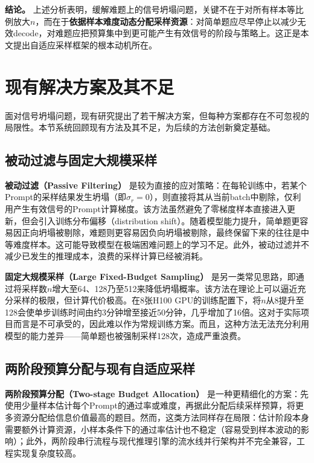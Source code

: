 \textbf{结论。} 上述分析表明，缓解难题上的信号坍塌问题，关键不在于对所有样本等比例放大$n$，而在于\textbf{依据样本难度动态分配采样资源}：对简单题应尽早停止以减少无效decode，对难题应把预算集中到更可能产生有效信号的阶段与策略上。这正是本文提出自适应采样框架的根本动机所在。

\section{现有解决方案及其不足}
\label{sec:limitations_of_existing_methods}

面对信号坍塌问题，现有研究提出了若干解决方案，但每种方案都存在不可忽视的局限性。本节系统回顾现有方法及其不足，为后续的方法创新奠定基础。

\subsection{被动过滤与固定大规模采样}
\label{subsec:filtering_and_large_budget}

\textbf{被动过滤（Passive Filtering）} 是较为直接的应对策略：在每轮训练中，若某个Prompt的采样结果发生坍塌（即$\sigma_r = 0$），则直接将其从当前batch中剔除，仅利用产生有效信号的Prompt计算梯度。该方法虽然避免了零梯度样本直接进入更新，但会引入训练分布偏移（distribution shift）。随着模型能力提升，简单题更容易因正向坍塌被剔除，难题则更容易因负向坍塌被剔除，最终保留下来的往往是中等难度样本。这可能导致模型在极端困难问题上的学习不足。此外，被动过滤并不减少已发生的推理成本，浪费的采样计算已经被消耗。

\textbf{固定大规模采样（Large Fixed-Budget Sampling）} 是另一类常见思路，即通过将采样数$n$增大至64、128乃至512来降低坍塌概率。该方法在理论上可以逼近充分采样的极限，但计算代价极高。在8张H100 GPU的训练配置下，将$n$从8提升至128会使单步训练时间由约3分钟增至接近50分钟，几乎增加了16倍。这对于实际项目而言是不可承受的，因此难以作为常规训练方案。而且，这种方法无法充分利用模型的能力差异——简单题也被强制采样128次，造成严重浪费。

\subsection{两阶段预算分配与现有自适应采样}
\label{subsec:two_stage_and_adaptive}

\textbf{两阶段预算分配（Two-stage Budget Allocation）} 是一种更精细化的方案：先使用少量样本估计每个Prompt的通过率或难度，再据此分配后续采样预算，将更多资源分配给信息价值最高的题目。然而，这类方法同样存在局限：估计阶段本身需要额外计算资源，小样本条件下的通过率估计也不稳定（容易受到样本波动的影响）；此外，两阶段串行流程与现代推理引擎的流水线并行架构并不完全兼容，工程实现复杂度较高。

